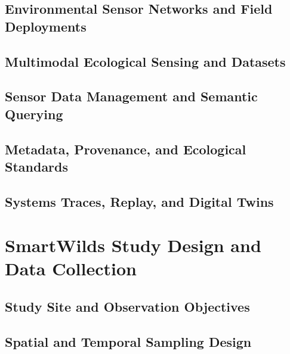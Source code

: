 \documentclass[manuscript]{acmart}
\begin{document}
\subsection{Environmental Sensor Networks and Field Deployments}

\subsection{Multimodal Ecological Sensing and Datasets}

\subsection{Sensor Data Management and Semantic Querying}

\subsection{Metadata, Provenance, and Ecological Standards}


\subsection{Systems Traces, Replay, and Digital Twins}


\newpage
\section{SmartWilds Study Design and Data Collection}
\label{sec:collection}


\subsection{Study Site and Observation Objectives}

\subsection{Spatial and Temporal Sampling Design}
\end{document}
